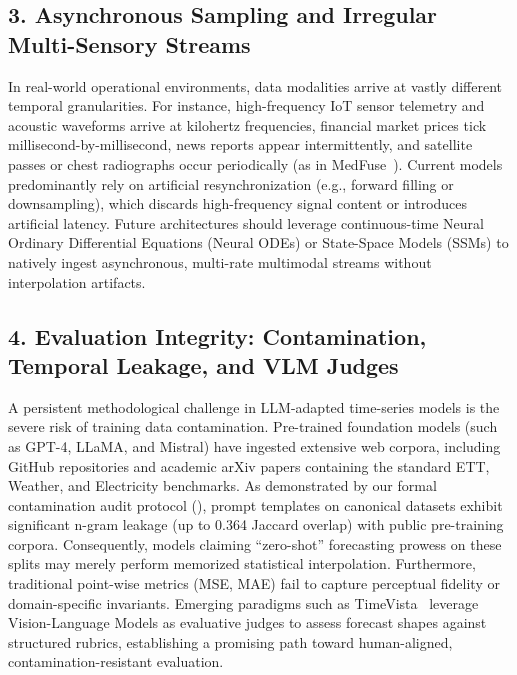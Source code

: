 \subsection{3. Asynchronous Sampling and Irregular Multi-Sensory Streams}
In real-world operational environments, data modalities arrive at vastly different temporal granularities. For instance, high-frequency IoT sensor telemetry and acoustic waveforms arrive at kilohertz frequencies, financial market prices tick millisecond-by-millisecond, news reports appear intermittently, and satellite passes or chest radiographs occur periodically (as in MedFuse~\cite{Hayat2022MedFuse}). Current models predominantly rely on artificial resynchronization (e.g., forward filling or downsampling), which discards high-frequency signal content or introduces artificial latency. Future architectures should leverage continuous-time Neural Ordinary Differential Equations (Neural ODEs) or State-Space Models (SSMs) to natively ingest asynchronous, multi-rate multimodal streams without interpolation artifacts.

\subsection{4. Evaluation Integrity: Contamination, Temporal Leakage, and VLM Judges}
A persistent methodological challenge in LLM-adapted time-series models is the severe risk of training data contamination. Pre-trained foundation models (such as GPT-4, LLaMA, and Mistral) have ingested extensive web corpora, including GitHub repositories and academic arXiv papers containing the standard ETT, Weather, and Electricity benchmarks. As demonstrated by our formal contamination audit protocol (), prompt templates on canonical datasets exhibit significant n-gram leakage (up to 0.364 Jaccard overlap) with public pre-training corpora. Consequently, models claiming ``zero-shot'' forecasting prowess on these splits may merely perform memorized statistical interpolation. Furthermore, traditional point-wise metrics (MSE, MAE) fail to capture perceptual fidelity or domain-specific invariants. Emerging paradigms such as TimeVista~\cite{Chen2026TimeVista} leverage Vision-Language Models as evaluative judges to assess forecast shapes against structured rubrics, establishing a promising path toward human-aligned, contamination-resistant evaluation.

